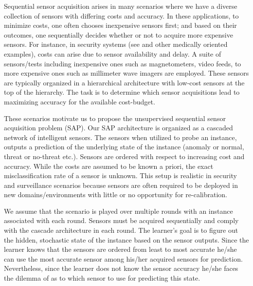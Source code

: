 Sequential sensor acquisition arises in many scenarios where we have a diverse collection of sensors with differing costs and accuracy. In these applications, to minimize costs, one often chooses inexpensive sensors first; and based on their outcomes, one sequentially decides whether or not to acquire more expensive sensors. For instance, in security systems%
 (see \cite{ML13_MultistageClassifier_TrapezSaligramaCastanon} and other medically oriented examples), costs can arise due to sensor availability and delay. A suite of sensors/tests including inexpensive ones such as magnetometers, video feeds, to more expensive ones such as millimeter wave imagers are employed. These sensors are typically organized in a hierarchical architecture with low-cost sensors at the top of the hierarchy. The task is to determine which sensor acquisitions lead to maximizing accuracy for the available cost-budget. 

These scenarios motivate us to propose the unsupervised sequential sensor acquisition problem (SAP). Our SAP architecture is organized as a cascaded network of intelligent sensors. The sensors when utilized to probe an instance, outputs a prediction of the underlying state of the instance (anomaly or normal, threat or no-threat etc.). Sensors are ordered with respect to increasing cost and accuracy. While the costs are assumed to be known a priori, the exact misclassification rate of a sensor is unknown. This setup is realistic in security and surveillance scenarios because sensors are often required to be deployed in new domains/environments with little or no opportunity for re-calibration. 

We assume that the scenario is played over multiple rounds with an instance associated with each round. Sensors must be acquired sequentially and comply with the cascade architecture in each round. The learner's goal is to figure out the hidden, stochastic state of the instance based on the sensor outputs. Since the learner knows that the sensors are ordered from least to most accurate he/she can use the most accurate sensor among his/her acquired sensors for prediction. Nevertheless, since the learner does not know the sensor accuracy he/she faces the dilemma of as to which sensor to use for predicting this state.



